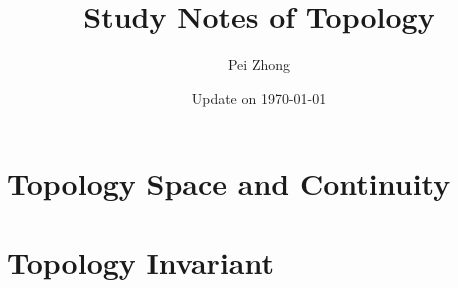\documentclass[12pt,oneside]{book} %
\begin{document}
\title{\bf \huge Study Notes of Topology}
\author{Pei Zhong}
\date{Update on \today}

\maketitle


\tableofcontents

\begin{spacing}{1}












\part{Topology Space and Continuity}




\part{Topology Invariant}







\end{spacing}
\end{document}
